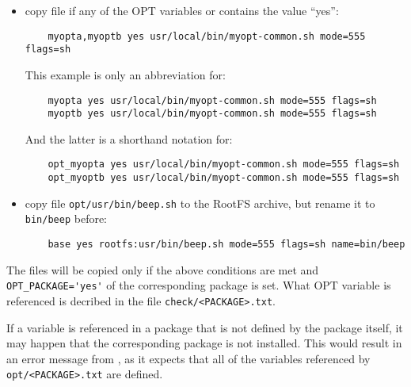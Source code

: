\begin{itemize}
        \item copy file if any of the OPT variables 
        or  contains the value ``yes'':

\begin{example}
\begin{verbatim}
    myopta,myoptb yes usr/local/bin/myopt-common.sh mode=555 flags=sh
\end{verbatim}
\end{example}

        This example is only an abbreviation for:

\begin{example}
\begin{verbatim}
    myopta yes usr/local/bin/myopt-common.sh mode=555 flags=sh
    myoptb yes usr/local/bin/myopt-common.sh mode=555 flags=sh
\end{verbatim}
\end{example}

        And the latter is a shorthand notation for:

\begin{example}
\begin{verbatim}
    opt_myopta yes usr/local/bin/myopt-common.sh mode=555 flags=sh
    opt_myoptb yes usr/local/bin/myopt-common.sh mode=555 flags=sh
\end{verbatim}
\end{example}

        \item copy file \texttt{opt/usr/bin/beep.sh} to the RootFS archive,
        but rename it to \texttt{bin/beep} before:

\begin{example}
\begin{verbatim}
    base yes rootfs:usr/bin/beep.sh mode=555 flags=sh name=bin/beep
\end{verbatim}
\end{example}

    \end{itemize}

    The files will be copied only if the above conditions are met and
    \verb+OPT_PACKAGE='yes'+ of the corresponding package is set. What OPT variable is
    referenced is decribed in the file \texttt{check/<PACKAGE>.txt}.

    If a variable is referenced in a package that is not defined by the package
    itself, it may happen that the corresponding package is not installed. This
    would result in an error message from , as it expects that all of
    the variables referenced by \texttt{opt/<PACKAGE>.txt} are defined.


